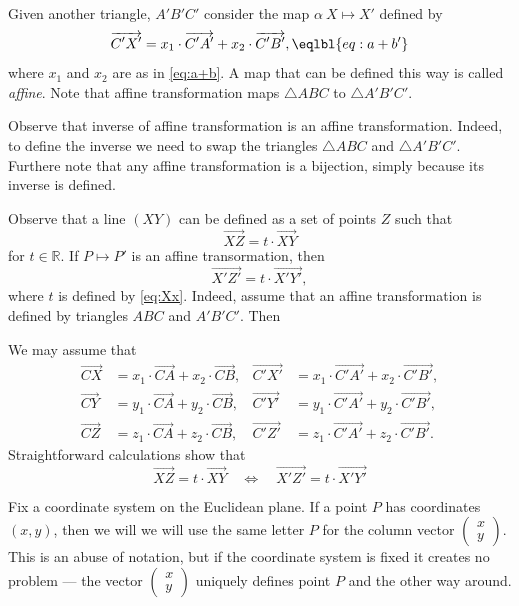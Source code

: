 Given another triangle, $A'B'C'$ consider the map $\alpha\:X\mapsto X'$ defined by 
\[\overrightarrow{C'X'}=x_1\cdot \overrightarrow{C'A'}+x_2\cdot \overrightarrow{C'B'},\eqlbl{eq:a+b'}\]
where $x_1$ and $x_2$ are as in \ref{eq:a+b}.
A map that can be defined this way is called \emph{affine}.
Note that affine transformation maps $\triangle ABC$ to $\triangle A'B'C'$.

Observe that inverse of affine transformation is an affine transformation.
Indeed, to define the inverse we need to swap the triangles $\triangle ABC$ and $\triangle A'B'C'$.
Furthere note that any affine transformation is a bijection,
simply because its inverse is defined.

Observe that a line $(XY)$ can be defined as a set of points $Z$ such that 
\[\overrightarrow{XZ}=t\cdot \overrightarrow{XY}\]
for $t\in \mathbb{R}$.
If $P\mapsto P'$ is an affine transormation, then 
\[\overrightarrow{X'Z'}=t\cdot \overrightarrow{X'Y'},\]
where $t$ is defined by \ref{eq:Xx}.
Indeed, assume that an affine transformation is defined by triangles $ABC$ and $A'B'C'$.
Then 

We may assume that 
\begin{align*}
\overrightarrow{CX}
&=x_1\cdot \overrightarrow{CA}+x_2\cdot \overrightarrow{CB},
&
\overrightarrow{C'X'}
&=x_1\cdot \overrightarrow{C'A'}+x_2\cdot \overrightarrow{C'B'},
\\
\overrightarrow{CY}&=y_1\cdot \overrightarrow{CA}+y_2\cdot \overrightarrow{CB},
&
\overrightarrow{C'Y'}&=y_1\cdot \overrightarrow{C'A'}+y_2\cdot \overrightarrow{C'B'},
\\
\overrightarrow{CZ}&=z_1\cdot \overrightarrow{CA}+z_2\cdot \overrightarrow{CB},
&
\overrightarrow{C'Z'}&=z_1\cdot \overrightarrow{C'A'}+z_2\cdot \overrightarrow{C'B'}.
\end{align*}
Straightforward calculations show that 
\[\overrightarrow{XZ}=t\cdot \overrightarrow{XY}
\quad\Longleftrightarrow\quad
\overrightarrow{X'Z'}=t\cdot \overrightarrow{X'Y'}\]



Fix a coordinate system on the Euclidean plane.
If a point $P$ has coordinates $(x,y)$, then we will we will use the same letter $P$ for the column vector $(\begin{smallmatrix}x\\y\end{smallmatrix})$.
This is an abuse of notation, but if the coordinate system is fixed it creates no problem --- the vector $(\begin{smallmatrix}x\\y\end{smallmatrix})$ uniquely defines point $P$ and the other way around.


